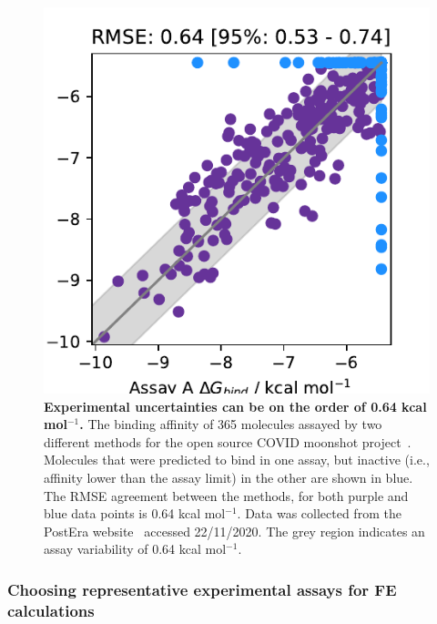\documentclass[9pt,bestpractices]{livecoms}
\begin{document}
\begin{figure}
    \centering
    \includegraphics[width=0.95\linewidth]{figures/reporting/moonshot-assays.pdf}
    \caption{\textbf{Experimental uncertainties can be on the order of 0.64 kcal mol$^{-1}$.} The binding affinity of 365 molecules assayed by two different methods for the open source COVID moonshot project~\cite{achdout2020covid}. Molecules that were predicted to bind in one assay, but inactive (i.e., affinity lower than the assay limit) in the other are shown in blue. The RMSE agreement between the methods, for both purple and blue data points is 0.64 kcal mol$^{-1}$. Data was collected from the PostEra website~\cite{posteracovid} accessed 22/11/2020. The grey region indicates an assay variability of 0.64 kcal mol$^{-1}$.}
    \label{fig:expt_agreement}
\end{figure}



\subsubsection{Choosing representative experimental assays for FE calculations}
\end{document}

